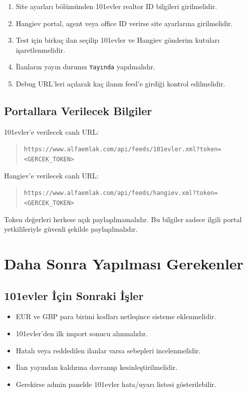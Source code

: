 \documentclass[11pt,a4paper]{article}
\newcommand{\code}[1]{\texttt{#1}}
\begin{document}
\begin{enumerate}
  \item Site ayarları bölümünden 101evler realtor ID bilgileri girilmelidir.
  \item Hangiev portal, agent veya office ID verirse site ayarlarına girilmelidir.
  \item Test için birkaç ilan seçilip 101evler ve Hangiev gönderim kutuları işaretlenmelidir.
  \item İlanların yayın durumu \code{Yayında} yapılmalıdır.
  \item Debug URL'leri açılarak kaç ilanın feed'e girdiği kontrol edilmelidir.
\end{enumerate}

\subsection{Portallara Verilecek Bilgiler}

101evler'e verilecek canlı URL:

\begin{quote}
\code{https://www.alfaemlak.com/api/feeds/101evler.xml?token=<GERCEK\_TOKEN>}
\end{quote}

Hangiev'e verilecek canlı URL:

\begin{quote}
\code{https://www.alfaemlak.com/api/feeds/hangiev.xml?token=<GERCEK\_TOKEN>}
\end{quote}

Token değerleri herkese açık paylaşılmamalıdır. Bu bilgiler sadece ilgili portal yetkilileriyle güvenli şekilde paylaşılmalıdır.

\section{Daha Sonra Yapılması Gerekenler}

\subsection{101evler İçin Sonraki İşler}

\begin{itemize}
  \item EUR ve GBP para birimi kodları netleşince sisteme eklenmelidir.
  \item 101evler'den ilk import sonucu alınmalıdır.
  \item Hatalı veya reddedilen ilanlar varsa sebepleri incelenmelidir.
  \item İlan yayından kaldırma davranışı kesinleştirilmelidir.
  \item Gerekirse admin panelde 101evler hata/uyarı listesi gösterilebilir.
\end{itemize}
\end{document}
